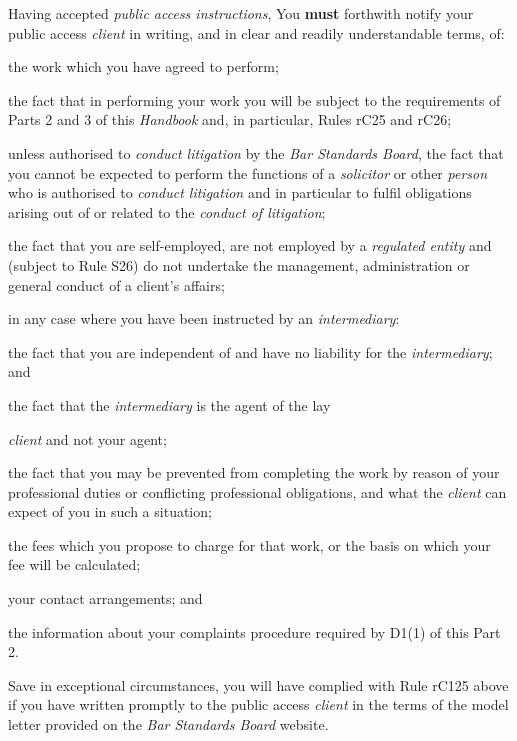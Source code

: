 Having accepted \emph{public access instructions}, You \textcolor{myred}{\textbf{must}} forthwith
notify your public access \emph{client} in writing, and in clear and
readily understandable terms, of:
\begin{numlist}\item the work which you have agreed to perform;
\item the fact that in performing your work you will be subject to the
requirements of Parts 2 and 3 of this \emph{Handbook} and, in
particular, Rules rC25 and rC26;
\item unless authorised to \emph{conduct litigation} by the \emph{Bar
Standards Board}, the fact that you cannot be expected to perform the
functions of a \emph{solicitor} or other \emph{person} who is authorised
to \emph{conduct litigation} and in particular to fulfil obligations
arising out of or related to the \emph{conduct of litigation};
\item the fact that you are self-employed, are not employed by a
\emph{regulated entity} and (subject to Rule S26) do not undertake the
management, administration or general conduct of a client's affairs;
\item in any case where you have been instructed by an \emph{intermediary}:
\begin{alphlist}\item the fact that you are independent of and have no liability for the
\emph{intermediary}; and
\item the fact that the \emph{intermediary} is the agent of the lay\end{alphlist}
\emph{client} and not your agent;
\item the fact that you may be prevented from completing the work by reason
of your professional duties or conflicting professional obligations, and
what the \emph{client} can expect of you in such a situation;
\item the fees which you propose to charge for that work, or the basis on
which your fee will be calculated;
\item your contact arrangements; and
\item the information about your complaints procedure required by D1(1) of
this Part 2.
\end{numlist}

Save in exceptional circumstances, you will have complied with Rule
rC125 above if you have written promptly to the public access
\emph{client} in the terms of the model letter provided on the \emph{Bar
Standards Board} website.

